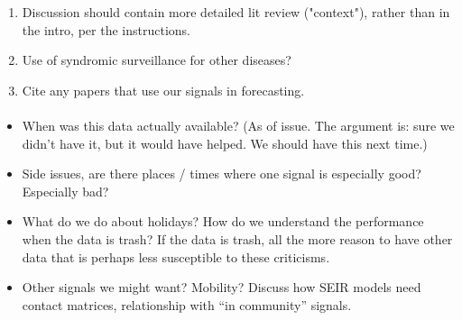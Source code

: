\documentclass[9pt,twocolumn,twoside,lineno]{pnas-new}
\begin{document}
\begin{enumerate}

\item Discussion should contain more detailed lit review ("context"), rather
  than in the intro, per the instructions. 

\item Use of syndromic surveillance for other diseases?

\item Cite any papers that use our signals in forecasting.
\end{enumerate}

\paragraph{}



\begin{itemize}

\item When was this data actually available? (As of issue. The argument is: sure
  we didn't have it, but it would have helped. We should have this next time.)
\item Side issues, are there places / times where one signal is especially good?
  Especially bad?
\item What do we do about holidays? How do we understand the performance when
  the data is trash? If the data is trash, all the more reason to have other
  data that is perhaps less susceptible to these criticisms.
\item Other signals we might want? Mobility? Discuss how SEIR models need
  contact matrices, relationship with ``in community'' signals.
  
\end{itemize}

\showmatmethods{} %


\showacknow{} %


\end{document}

